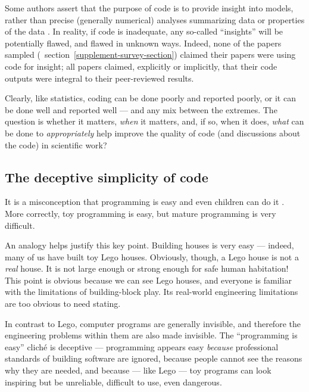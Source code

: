 \documentclass{comjnl}
\begin{document}
Some authors assert that the purpose of code is to provide insight into models, rather than precise (generally numerical) analyses summarizing data or properties of the data \cite{assessing-quality}. In reality, if code is inadequate, any so-called ``insights'' will be potentially flawed, and flawed in unknown ways. Indeed, none of the papers sampled (\supplement\ section~\ref{supplement-survey-section}) claimed their papers were using code for insight; all papers claimed, explicitly or implicitly, that their code outputs were integral to their peer-reviewed results.

Clearly, like statistics, coding can be done poorly and reported poorly, or it can be done well and reported well --- and any mix between the extremes. The question is whether it matters, \emph{when\/} it matters, and, if so, when it does, \emph{what\/} can be done to \emph{appropriately\/} help improve the quality of code (and discussions about the code) in scientific work?

\subsection{The deceptive simplicity of code}\label{deceptive-simplicity-of-code}
It is a misconception that programming is easy and even children can do it \cite{fixit}. More correctly, toy programming is easy, but mature programming is very difficult. %

An analogy helps justify this key point. Building houses is very easy --- indeed, many of us have built toy Lego houses. Obviously, though, a Lego house is not a \emph{real\/} house. It is not large enough or strong enough for safe human habitation! This point is obvious because we can see Lego houses, and everyone is familiar with the limitations of building-block play. Its real-world engineering limitations are too obvious to need stating. 

In contrast to Lego, computer programs are generally invisible, and therefore the engineering problems within them are also made invisible. The ``programming is easy'' clich\' e is deceptive --- programming appears easy \emph{because\/} professional standards of building software are ignored, because people cannot see the reasons why they are needed, and because --- like Lego --- toy programs can look inspiring but be unreliable, difficult to use, even dangerous. 
\end{document}
